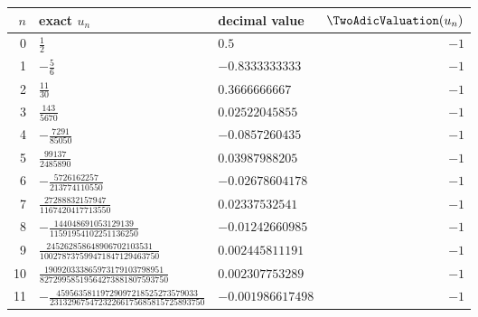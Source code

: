 \begin{tabular}{@{}rllr@{}}
\toprule
$n$ & exact $u_n$ & decimal value & $\TwoAdicValuation(u_n)$ \\
\midrule
0 & $\frac{1}{2}$ & $0.5$ & $-1$ \\
1 & $-\frac{5}{6}$ & $-0.8333333333$ & $-1$ \\
2 & $\frac{11}{30}$ & $0.3666666667$ & $-1$ \\
3 & $\frac{143}{5670}$ & $0.02522045855$ & $-1$ \\
4 & $-\frac{7291}{85050}$ & $-0.0857260435$ & $-1$ \\
5 & $\frac{99137}{2485890}$ & $0.03987988205$ & $-1$ \\
6 & $-\frac{5726162257}{213774110550}$ & $-0.02678604178$ & $-1$ \\
7 & $\frac{27288832157947}{1167420417713550}$ & $0.02337532541$ & $-1$ \\
8 & $-\frac{144048691053129139}{11591954102251136250}$ & $-0.01242660985$ & $-1$ \\
9 & $\frac{245262858648906702103531}{100278737599471847129463750}$ & $0.002445811191$ & $-1$ \\
10 & $\frac{190920333865973179103798951}{82729958519564273881807593750}$ & $0.002307753289$ & $-1$ \\
11 & $-\frac{45956358119729097218525273579033}{23132967547232266175685815725893750}$ & $-0.001986617498$ & $-1$ \\
\bottomrule
\end{tabular}
